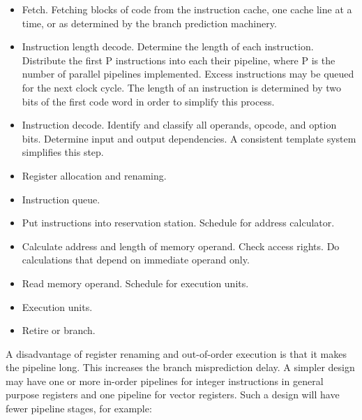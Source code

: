 \documentclass[forwardcom.tex]{subfiles}
\begin{document}
\begin{itemize}
\item  Fetch. Fetching blocks of code from the instruction cache, one cache line at a time, or as determined by the branch prediction machinery. 

\item  Instruction length decode. Determine the length of each instruction. Distribute the first P instructions into each their pipeline, where P is the number of parallel pipelines implemented. Excess instructions may be queued for the next clock cycle. The length of an instruction is determined by two bits of the first code word in order to simplify this process.

\item  Instruction decode. Identify and classify all operands, opcode, and option bits. Determine input and output dependencies. A consistent template system simplifies this step.

\item  Register allocation and renaming. 

\item  Instruction queue. 

\item  Put instructions into reservation station. Schedule for address calculator. 

\item  Calculate address and length of memory operand. Check access rights. Do calculations that depend on immediate operand only.

\item  Read memory operand. Schedule for execution units.  

\item  Execution units.  

\item  Retire or branch. 
\end{itemize}

A disadvantage of register renaming and out-of-order execution is that it makes the pipeline long. This increases the branch misprediction delay. A simpler design may have one or more in-order pipelines for integer instructions in general purpose registers and one pipeline for vector registers. Such a design will have fewer pipeline stages, for example:
\vspace{2mm}
\end{document}
